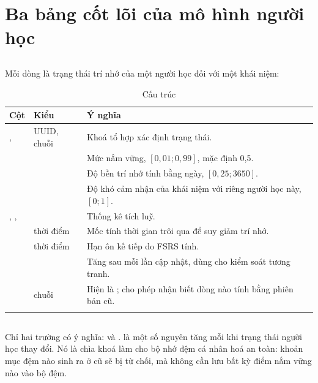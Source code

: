 \section{Ba bảng cốt lõi của mô hình người học}

\subsection{}

Mỗi dòng là trạng thái trí nhớ của một người học đối với một khái niệm:

\begin{longtable}{L{4.4cm} L{2.4cm} L{6.8cm}}
\toprule
\textbf{Cột} & \textbf{Kiểu} & \textbf{Ý nghĩa}\\
\midrule
\endhead
{},  & UUID, chuỗi & Khoá tổ hợp xác định trạng thái.\\
 &  & Mức nắm vững, \([0{,}01; 0{,}99]\), mặc định 0,5.\\
 &  & Độ bền trí nhớ tính bằng ngày, \([0{,}25; 3650]\).\\
 &  & Độ khó cảm nhận của khái niệm với riêng người học này, \([0;1]\).\\
, ,  &  & Thống kê tích luỹ.\\
 & thời điểm & Mốc tính thời gian trôi qua để suy giảm trí nhớ.\\
 & thời điểm & Hạn ôn kế tiếp do FSRS tính.\\
 &  & Tăng sau mỗi lần cập nhật, dùng cho kiểm soát tương tranh.\\
 & chuỗi & Hiện là ; cho phép nhận biết dòng nào tính bằng phiên bản cũ.\\
\bottomrule
\caption{Cấu trúc }
\end{longtable}

\subsection{}

Chỉ hai trường có ý nghĩa:  và .  là
một số nguyên tăng mỗi khi trạng thái người học thay đổi. Nó là chìa khoá làm cho bộ nhớ
đệm cá nhân hoá an toàn: khoản mục đệm nào sinh ra ở  cũ sẽ bị từ chối, mà
không cần lưu bất kỳ điểm nắm vững nào vào bộ đệm.

